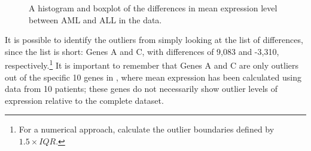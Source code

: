 \begin{figure}[h!]
	\centering
	\caption{A histogram and boxplot of the differences in mean expression level between AML and ALL in the  data.}
	\label{golubSmallHistandBox}
\end{figure}

It is possible to identify the outliers from simply looking at the list of differences, since the list is short: Genes A and C, with differences of 9,083 and -3,310, respectively.\footnote{For a numerical approach, calculate the outlier boundaries defined by $1.5 \times IQR$.} It is important to remember that Genes A and C are only outliers out of the specific 10 genes in , where mean expression has been calculated using data from 10 patients; these genes do not necessarily show outlier levels of expression relative to the complete dataset.

